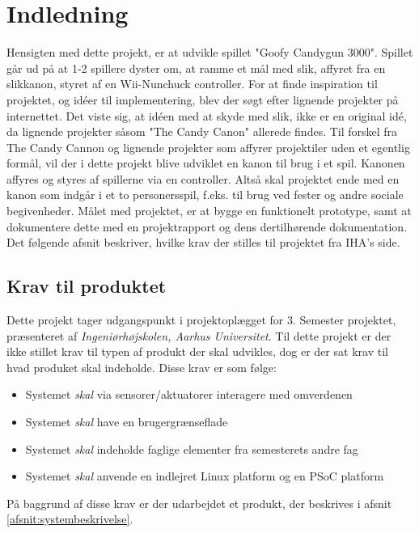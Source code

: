 \chapter{Indledning}
Hensigten med dette projekt, er at udvikle spillet "Goofy Candygun 3000". Spillet går ud på at 1-2 spillere dyster om, at ramme et mål med slik, affyret fra en slikkanon, styret af en Wii-Nunchuck controller. For at finde inspiration til projektet, og idéer til implementering, blev der søgt efter lignende projekter på internettet. Det viste sig, at idéen med at skyde med slik, ikke er en original idé, da lignende projekter såsom "The Candy Canon" \cite{Website:CandyCanon} allerede findes. Til forskel fra The Candy Cannon og lignende projekter som affyrer projektiler uden et egentlig formål, vil der i dette projekt blive udviklet en kanon til brug i et spil. Kanonen affyres og styres af spillerne via en controller. Altså skal projektet ende med en kanon som indgår i et to personersspil, f.eks. til brug ved fester og andre sociale begivenheder.
Målet med projektet, er at bygge en funktionelt prototype, samt at dokumentere dette med en projektrapport og dens dertilhørende dokumentation. 
Det følgende afsnit beskriver, hvilke krav der stilles til projektet fra IHA's side.

\section{Krav til produktet}
Dette projekt tager udgangspunkt i projektoplægget for 3. Semester projektet, præsenteret af \textit{Ingeniørhøjskolen, Aarhus Universitet}. Til dette projekt er der ikke stillet krav til typen af produkt der skal udvikles, dog er der sat krav til hvad produket skal indeholde. Disse krav er som følge:

\begin{itemize}
	\item{Systemet \textit{skal} via sensorer/aktuatorer interagere med omverdenen}
	\item{Systemet \textit{skal} have en brugergrænseflade}
	\item{Systemet \textit{skal} indeholde faglige elementer fra semesterets andre fag}
	\item{Systemet \textit{skal} anvende en indlejret Linux platform og en PSoC platform}
\end{itemize}

På baggrund af disse krav er der udarbejdet et produkt, der beskrives i afsnit \ref{afsnit:systembeskrivelse}.


